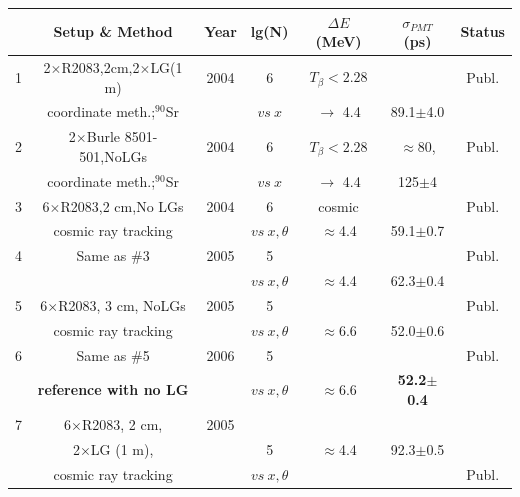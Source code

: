 \begin{table}[htbp]
\begin{center}
\begin{tabular}{|c|c|c|c|c|c|c|} \hline
  & Setup \& Method                & Year &lg(N)&$\Delta E$ (MeV) & $\sigma_{PMT}$(ps)& Status \\ \hline
1 & 2$\times$R2083,2cm,2$\times$LG(1 m)& 2004 &6    & $T_{\beta}<2.28$ &        &\small{Publ.}   \\
  & coordinate meth.;$^{90}$Sr   &      &  $vs~x$   & $\to$ 4.4        & 89.1$\pm$4.0        &                \\ \hline
2 & 2$\times$Burle 8501-501,NoLGs & 2004 &6 & $T_{\beta}<2.28$ & $\approx$80,    &\small{Publ.}   \\ 
  & coordinate meth.;$^{90}$Sr   &      &  $vs~x$   & $\to$ 4.4        & 125$\pm$4           &                \\ \hline
3 & 6$\times$R2083,2 cm,No LGs   & 2004 &6 & cosmic            &  &\small{Publ.}   \\
  & cosmic ray tracking            &    & $vs~x,\theta$  & $\approx$4.4     & 59.1$\pm$0.7       &                \\ \hline
4 & Same as \#3                    & 2005 &5 &                  &                     &\small{Publ.}   \\
  &                                &      &  $vs~x,\theta$ & $\approx$4.4     & 62.3$\pm$0.4       &                \\ \hline
5 & 6$\times$R2083, 3 cm, NoLGs    & 2005 &5 &                  &                     &\small{Publ.}   \\
  & cosmic ray tracking            &      &  $vs~x,\theta$ & $\approx$6.6     & 52.0$\pm$0.6       &                \\ \hline
6 & Same as \#5                    & 2006 &5 &                  &                    &\small{Publ.}   \\
  & \textbf{reference with no LG}  &      & $vs~x,\theta$  & $\approx$6.6     & \textbf{52.2$\pm$0.4}       &                \\ \hline
7 & 6$\times$R2083, 2 cm,          & 2005 &  &                  &                   &   \\
  & 2$\times$LG (1 m),             &      &5 & $\approx$4.4     & 92.3$\pm$0.5      &                \\
  & cosmic ray tracking            &      & $vs~x,\theta$  &                  &     &\small{Publ.}   \\ \hline

\end{tabular}
\end{center}
\end{table}
